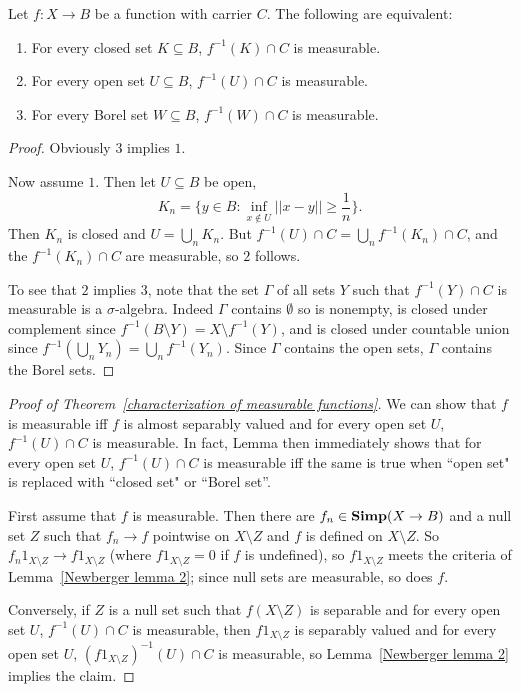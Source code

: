 \begin{lemma}
\label{Newberger lemma 3}
Let $f: X \to B$ be a function with carrier $C$. The following are equivalent:
\begin{enumerate}
\item For every closed set $K \subseteq B$, $f^{-1}(K) \cap C$ is measurable.
\item For every open set $U \subseteq B$, $f^{-1}(U) \cap C$ is measurable.
\item For every Borel set $W \subseteq B$, $f^{-1}(W) \cap C$ is measurable.
\end{enumerate}
\end{lemma}
\begin{proof}
Obviously $3$ implies $1$.

Now assume $1$. Then let $U \subseteq B$ be open,
\[K_{n} = \{y \in B: \inf_{x \notin U} ||x - y|| \geq \frac{1}{n}\}.\]
Then $K_{n}$ is closed and $U = \bigcup_{n} K_{n}$. But $f^{-1}(U) \cap C = \bigcup_{n} f^{-1}(K_{n}) \cap C$, and the $f^{-1}(K_{n}) \cap C$ are measurable, so $2$ follows.

To see that $2$ implies $3$, note that the set $\Gamma$ of all sets $Y$ such that $f^{-1}(Y) \cap C$ is measurable is a $\sigma$-algebra.
Indeed $\Gamma$ contains $\emptyset$ so is nonempty, is closed under complement since $f^{-1}(B \setminus Y) = X \setminus f^{-1}(Y)$, and is closed under countable union since $f^{-1}(\bigcup_{n} Y_{n}) = \bigcup_{n} f^{-1}(Y_{n})$.
Since $\Gamma$ contains the open sets, $\Gamma$ contains the Borel sets.
\end{proof}

\begin{proof}[Proof of Theorem~\ref{characterization of measurable functions}]
We can show that $f$ is measurable iff $f$ is almost separably valued and for every open set $U$, $f^{-1}(U) \cap C$ is measurable.
In fact, Lemma \label{Newberger lemma 3} then immediately shows that for every open set $U$, $f^{-1}(U) \cap C$ is measurable iff the same is true when ``open set" is replaced with ``closed set" or ``Borel set''.

First assume that $f$ is measurable. Then there are $f_{n} \in \mathbf{Simp}(X \to B)$ and a null set $Z$ such that $f_{n} \to f$ pointwise on $X \setminus Z$ and $f$ is defined on $X \setminus Z$.
So $f_{n}1_{X \setminus Z} \to f1_{X \setminus Z}$ (where $f1_{X \setminus Z} = 0$ if $f$ is undefined), so $f1_{X \setminus Z}$ meets the criteria of Lemma~\ref{Newberger lemma 2}; since null sets are measurable, so does $f$.

Conversely, if $Z$ is a null set such that $f(X \setminus Z)$ is separable and for every open set $U$, $f^{-1}(U) \cap C$ is measurable, then $f1_{X \setminus Z}$ is separably valued and for every open set $U$, $(f1_{X \setminus Z})^{-1}(U) \cap C$ is measurable, so Lemma~\ref{Newberger lemma 2} implies the claim.
\end{proof}

